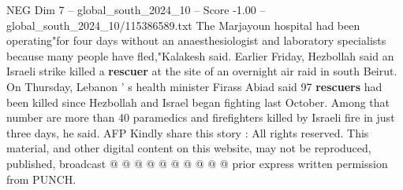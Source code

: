 \begin{textsample}{NEG Dim 7 – global\_south\_2024\_10 – Score -1.00 – global\_south\_2024\_10/115386589.txt}
The Marjayoun hospital had been operating"for four days without an anaesthesiologist and laboratory specialists because many people have fled,"Kalakesh said.
Earlier Friday, Hezbollah said an Israeli strike killed a \textbf{rescuer} at the site of an overnight air raid in south Beirut.
On Thursday, Lebanon ' s health minister Firass Abiad said 97 \textbf{rescuers} had been killed since Hezbollah and Israel began fighting last October.
Among that number are more than 40 paramedics and firefighters killed by Israeli fire in just three days, he said.
AFP Kindly share this story : All rights reserved.
This material, and other digital content on this website, may not be reproduced, published, broadcast @ @ @ @ @ @ @ @ @ @ prior express written permission from PUNCH.

\end{textsample}
